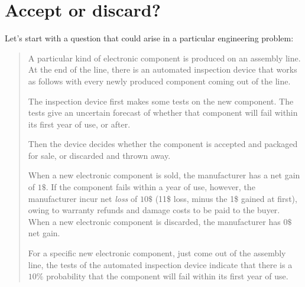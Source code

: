 \documentclass[
  a4paper,
  DIV=11,
  numbers=noendperiod,
  oneside]{scrreprt}
\begin{document}
\hypertarget{sec-intro}{%
\chapter{Accept or discard?}\label{sec-intro}}

\providecommand{\ul}{\uline}
\renewcommand*{\|}[1][]{\nonscript\:#1\vert\nonscript\:\mathopen{}}
\providecommand*{\pr}[1]{\textsf{\small`#1'}}
\renewcommand*{\pr}[1]{\textsf{\small`#1'}}
\providecommand*{\prq}[1]{\textsf{\small #1}}
\renewcommand*{\prq}[1]{\textsf{\small #1}}
\providecommand{\se}[1]{\mathsfit{#1}}
\renewcommand{\se}[1]{\mathsfit{#1}}
\providecommand{\p}{\mathrm{p}}
\renewcommand{\p}{\mathrm{p}}
\renewcommand{\P}{\mathrm{P}}

Let's start with a question that could arise in a particular engineering
problem:

\begin{quote}
A particular kind of electronic component is produced on an assembly
line. At the end of the line, there is an automated inspection device
that works as follows with every newly produced component coming out of
the line.

The inspection device first makes some tests on the new component. The
tests give an uncertain forecast of whether that component will fail
within its first year of use, or after.

Then the device decides whether the component is accepted and packaged
for sale, or discarded and thrown away.

When a new electronic component is sold, the manufacturer has a net gain
of \(1\$\). If the component fails within a year of use, however, the
manufacturer incur net \emph{loss} of \(10\$\) (11\$ loss, minus the 1\$
gained at first), owing to warranty refunds and damage costs to be paid
to the buyer. When a new electronic component is discarded, the
manufacturer has \(0\$\) net gain.

For a specific new electronic component, just come out of the assembly
line, the tests of the automated inspection device indicate that there
is a \(10\%\) probability that the component will fail within its first
year of use.
\end{quote}
\end{document}
